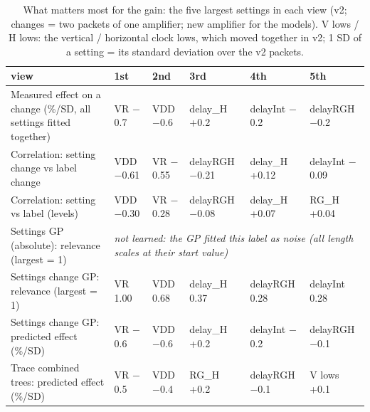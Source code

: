 \begin{table}[H]\centering\small
\caption{What matters most for the gain: the five largest settings in each view (v2; changes = two packets of one amplifier; new amplifier for the models). V lows / H lows: the vertical / horizontal clock lows, which moved together in v2; 1 SD of a setting = its standard deviation over the v2 packets.}
\begin{tabular}{p{5.2cm}lllll}\toprule
view & 1st & 2nd & 3rd & 4th & 5th\\\midrule
Measured effect on a change (\%/SD, all settings fitted together) & VR $-$0.7 & VDD $-$0.6 & delay\_H +0.2 & delayInt $-$0.2 & delayRGH $-$0.2\\
Correlation: setting change vs label change & VDD $-$0.61 & VR $-$0.55 & delayRGH $-$0.21 & delay\_H +0.12 & delayInt $-$0.09\\
Correlation: setting vs label (levels) & VDD $-$0.30 & VR $-$0.28 & delayRGH $-$0.08 & delay\_H +0.07 & RG\_H +0.04\\
Settings GP (absolute): relevance (largest = 1) & \multicolumn{5}{l}{\textit{not learned: the GP fitted this label as noise (all length scales at their start value)}}\\
Settings change GP: relevance (largest = 1) & VR 1.00 & VDD 0.68 & delay\_H 0.37 & delayRGH 0.28 & delayInt 0.28\\
Settings change GP: predicted effect (\%/SD) & VR $-$0.6 & VDD $-$0.6 & delay\_H +0.2 & delayInt $-$0.2 & delayRGH $-$0.1\\
Trace combined trees: predicted effect (\%/SD) & VR $-$0.5 & VDD $-$0.4 & RG\_H +0.2 & delayRGH $-$0.1 & V lows +0.1\\
\bottomrule\end{tabular}\end{table}

